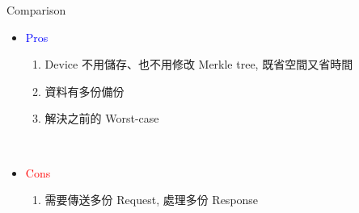 \begin{frame}{Comparison}
	\begin{itemize}
		\item \textcolor{blue}{Pros}
			\begin{enumerate}
				\item Device 不用儲存、也不用修改 Merkle tree, 既省空間又省時間
				\item 資料有多份備份
				\item 解決之前的 Worst-case
			\end{enumerate}
		~\\
		\item \textcolor{red}{Cons}
			\begin{enumerate}
				\item 需要傳送多份 Request, 處理多份 Response
			\end{enumerate}
	\end{itemize}
\end{frame}